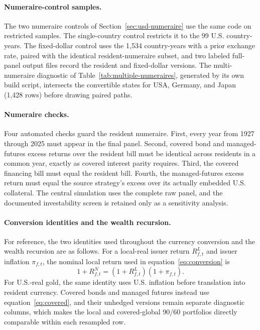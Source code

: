 \documentclass[11pt]{article}
\begin{document}
\paragraph{Numeraire-control samples.} The two numeraire controls of
Section~\ref{sec:usd-numeraire} use the same code on restricted samples. The
single-country control restricts it to the 99 U.S. country-years. The
fixed-dollar control uses the 1{,}534 country-years with a prior exchange
rate, paired with the identical resident-numeraire subset, and two labeled
full-panel output files record the resident and fixed-dollar versions. The
multi-numeraire diagnostic of Table~\ref{tab:multiple-numeraires}, generated
by its own build script, intersects the convertible states for USA, Germany,
and Japan (1{,}428 rows) before drawing paired paths.

\paragraph{Numeraire checks.} Four automated checks guard the resident
numeraire. First, every year from 1927 through 2025 must appear in the final
panel. Second, covered bond and managed-futures excess returns over the
resident bill must be identical across residents in a common year, exactly as
covered interest parity requires. Third, the covered financing bill must
equal the resident bill. Fourth, the managed-futures excess return must equal
the source strategy's excess over its actually embedded U.S. collateral. The
central simulation uses the complete raw panel, and the documented
investability screen is retained only as a sensitivity analysis.

\paragraph{Conversion identities and the wealth recursion.} For reference, the
two identities used throughout the currency conversion and the wealth
recursion are as follows. For a local-real issuer return $R^{L}_{f,t}$ and
issuer inflation $\pi_{f,t}$, the nominal local return used in
equation~\eqref{eq:conversion} is
\begin{equation*}
  1+R^{N}_{f,t}=(1+R^{L}_{f,t})(1+\pi_{f,t}).
\end{equation*}
For U.S.-real gold, the same identity uses U.S. inflation before translation
into resident currency. Covered bonds and managed futures instead use
equation~\eqref{eq:covered}, and their unhedged versions remain separate
diagnostic columns, which makes the local and covered-global 90/60 portfolios
directly comparable within each resampled row.
\end{document}
